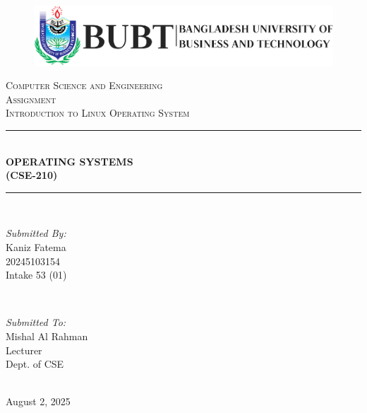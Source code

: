 \documentclass[12pt]{article}
\newcommand{\HRule}{\rule{\linewidth}{0.5mm}}
\begin{document}
\center
\begin{figure}[h!]
    \hspace*{0 cm} %
    \includegraphics{BubtLogoByKaniz.png}
\end{figure}
\textsc{\Large Computer Science and Engineering }\\[1.5cm]
\textsc{\Large Assignment}\\[0.3cm]
\textsc{\large Introduction to Linux Operating System}\\[1cm] 
\HRule \\[0.4cm]
{ \huge \bfseries OPERATING SYSTEMS\\[0.2cm]  (CSE-210)}\\[0.2cm] %
\HRule \\[2cm]


\begin{minipage}{0.4\textwidth}
\begin{flushleft} \large
\emph{Submitted By:}\\
Kaniz Fatema \\20245103154\\Intake 53 (01) %
\end{flushleft}
\end{minipage}
~
\begin{minipage}{0.4\textwidth}
\begin{flushright} \large
\emph{Submitted To:} \\
Mishal Al Rahman\\Lecturer\\Dept. of CSE %
\end{flushright}
\end{minipage}\\[5cm]


{\large August 2, 2025}\\[1cm] %
\end{document}

